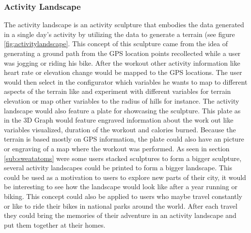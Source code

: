 \documentclass[../medieninformatik-arbeit.tex]{subfiles}
\begin{document}
\subsubsection{Activity Landscape}
The activity landscape is an activity sculpture that embodies the data generated in a single day's activity by utilizing the data to generate a terrain (see figure \ref{fig:activitylandscape}. This concept of this sculpture came from the idea of generating a ground path from the GPS location points recollected while a user was jogging or riding his bike. After the workout other activity information like heart rate or elevation change would be mapped to the GPS locations. The user would then select in the configurator which variables he wants to map to different aspects of the terrain like and experiment with different variables for terrain elevation or map other variables to the radius of hills for instance. The activity landscape would also feature a plate for showcasing the sculpture. This plate as in the 3D Graph would feature engraved information about the work out like variables visualized, duration of the workout and calories burned. Because the terrain is based mostly on GPS information, the plate could also have an picture or engraving of a map where the workout was performed. As seen in section \ref{sub:sweatatoms} were some users stacked sculptures to form a bigger sculpture, several activity landscapes could be printed to form a bigger landscape. This could be used as a motivation to users to explore new parts of their city, it would be interesting to see how the landscape would look like after a year running or biking. This concept could also be applied to users who maybe travel constantly or like to ride their bikes in national parks around the world. After each travel they could bring the memories of their adventure in an activity landscape and put them together at their homes. 
\end{document}
